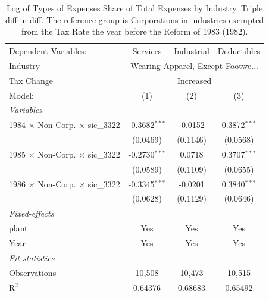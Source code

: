 \documentclass[
  12pt]{article}
\theoremstyle{definition}
\theoremstyle{remark}
\begin{document}
\begin{table}

\caption{\label{tbl-reg-exp-inds}Log of Types of Expenses Share of Total
Expenses by Industry. Triple diff-in-diff. The reference group is
Corporations in industries exempted from the Tax Rate the year before
the Reform of 1983 (1982).}

\begin{minipage}{\linewidth}

\begingroup
\centering
\begin{tabular}{lccc}
   \tabularnewline \midrule \midrule
   Dependent Variables:                          & Services        & Industrial & Deductibles\\  
   Industry & \multicolumn{3}{c}{Wearing Apparel, Except Footwe...} \\ 
   Tax Change & \multicolumn{3}{c}{Increased} \\ 
   Model:                                        & (1)             & (2)        & (3)\\  
   \midrule
   \emph{Variables}\\
   1984 $\times$ Non-Corp. $\times$ sic\_3322    & -0.3682$^{***}$ & -0.0152    & 0.3872$^{***}$\\   
                                                 & (0.0469)        & (0.1146)   & (0.0568)\\   
   1985 $\times$ Non-Corp. $\times$ sic\_3322    & -0.2730$^{***}$ & 0.0718     & 0.3707$^{***}$\\   
                                                 & (0.0589)        & (0.1109)   & (0.0655)\\   
   1986 $\times$ Non-Corp. $\times$ sic\_3322    & -0.3345$^{***}$ & -0.0201    & 0.3840$^{***}$\\   
                                                 & (0.0628)        & (0.1129)   & (0.0646)\\   
   \midrule
   \emph{Fixed-effects}\\
   plant                                         & Yes             & Yes        & Yes\\  
   Year                                          & Yes             & Yes        & Yes\\  
   \midrule
   \emph{Fit statistics}\\
   Observations                                  & 10,508          & 10,473     & 10,515\\  
   R$^2$                                         & 0.64376         & 0.68683    & 0.65492\\  

\end{tabular}
\end{minipage}
\end{table}
\end{document}
